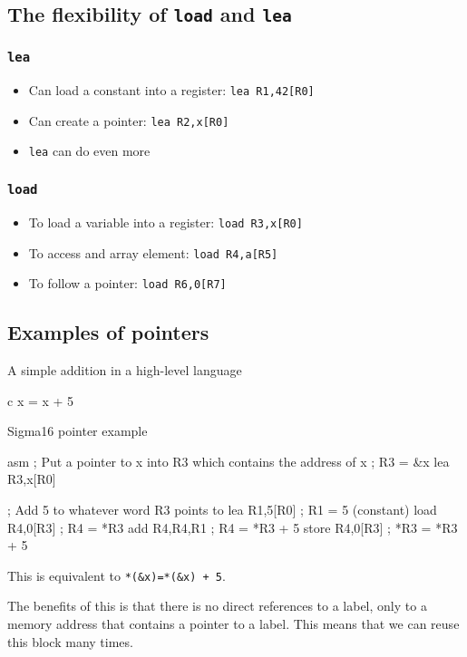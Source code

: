 \subsection[The flexibility of LOAD and LEA]{The flexibility of \texttt{load} and \texttt{lea}}\label{sub:the_flexibility_of_load_and_lea}

\subsubsection[LEA]{\texttt{lea}}\label{ssub:lea}

\begin{itemize}
	\item Can load a constant into a register: \texttt{lea R1,42[R0]}
	\item Can create a pointer: \texttt{lea R2,x[R0]}
	\item \texttt{lea} can do even more
\end{itemize}

\subsubsection[LOAD]{\texttt{load}}\label{ssub:load}

\begin{itemize}
	\item To load a variable into a register: \texttt{load R3,x[R0]}
	\item To access and array element: \texttt{load R4,a[R5]}
	\item To follow a pointer: \texttt{load R6,0[R7]}
\end{itemize}

\subsection{Examples of pointers}\label{sub:examples_of_pointers}

\begin{highlight}{A simple addition in a high-level language}
	\begin{code}{c}
		x = x + 5
	\end{code}
\end{highlight}

\begin{highlight}{Sigma16 pointer example}
	\begin{code}{asm}
		; Put a pointer to x into R3 which contains the address of x
		; R3 = &x
		lea R3,x[R0]

		; Add 5 to whatever word R3 points to
		lea R1,5[R0] ; R1 = 5 (constant)
		load R4,0[R3] ; R4 = *R3
		add R4,R4,R1 ; R4 = *R3 + 5
		store R4,0[R3] ; *R3 = *R3 + 5
	\end{code}
\end{highlight}
\begin{note}
	This is equivalent to \texttt{*(&x)=*(&x) + 5}.
\end{note}
The benefits of this is that there is no direct references to a label, only to a memory address that contains a pointer to a label.
This means that we can reuse this block many times.

